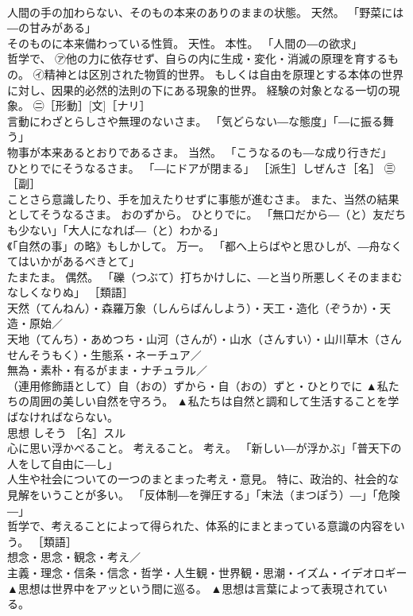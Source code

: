 \documentclass[8pt]{extreport}
\begin{document}
\begin{CJK}{UTF8}{min}
\\	人間の手の加わらない、そのもの本来のありのままの状態。 天然。 「野菜には―の甘みがある」 
\\	そのものに本来備わっている性質。 天性。 本性。 「人間の―の欲求」 
\\	哲学で、 ㋐他の力に依存せず、自らの内に生成・変化・消滅の原理を育するもの。 ㋑精神とは区別された物質的世界。 もしくは自由を原理とする本体の世界に対し、因果的必然的法則の下にある現象的世界。 経験の対象となる一切の現象。 ㊁［形動］[文]［ナリ］ 
\\	言動にわざとらしさや無理のないさま。 「気どらない―な態度」「―に振る舞う」 
\\	物事が本来あるとおりであるさま。 当然。 「こうなるのも―な成り行きだ」 
\\	ひとりでにそうなるさま。 「―にドアが閉まる」 ［派生］しぜんさ［名］ ㊂［副］ 
\\	ことさら意識したり、手を加えたりせずに事態が進むさま。 また、当然の結果としてそうなるさま。 おのずから。 ひとりでに。 「無口だから―（と）友だちも少ない」「大人になれば―（と）わかる」 
\\	《「自然の事」の略》もしかして。 万一。 「都へ上らばやと思ひしが、―舟なくてはいかがあるべきとて」 
\\	たまたま。 偶然。 「礫（つぶて）打ちかけしに、―と当り所悪しくそのままむなしくなりぬ」 ［類語］ 
\\	天然（てんねん）・森羅万象（しんらばんしよう）・天工・造化（ぞうか）・天造・原始／
\\	天地（てんち）・あめつち・山河（さんが）・山水（さんすい）・山川草木（さんせんそうもく）・生態系・ネーチュア／ 
\\	無為・素朴・有るがまま・ナチュラル／
\\	（連用修飾語として）自（おの）ずから・自（おの）ずと・ひとりでに	▲私たちの周囲の美しい自然を守ろう。 ▲私たちは自然と調和して生活することを学ばなければならない。
\\	思想	しそう	［名］スル 
\\	心に思い浮かべること。 考えること。 考え。 「新しい―が浮かぶ」「普天下の人をして自由に―し」 
\\	人生や社会についての一つのまとまった考え・意見。 特に、政治的、社会的な見解をいうことが多い。 「反体制―を弾圧する」「末法（まつぽう）―」「危険―」 
\\	哲学で、考えることによって得られた、体系的にまとまっている意識の内容をいう。 ［類語］
\\	想念・思念・観念・考え／
\\	主義・理念・信条・信念・哲学・人生観・世界観・思潮・イズム・イデオロギー	▲思想は世界中をアッという間に巡る。 ▲思想は言葉によって表現されている。

\end{CJK}
\end{document}
